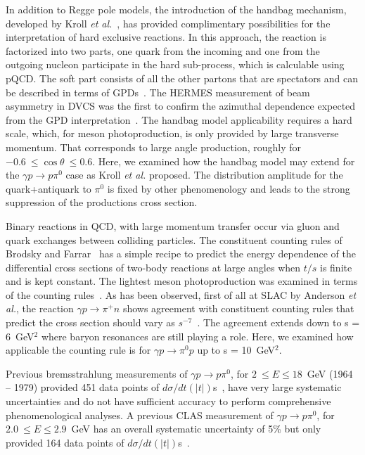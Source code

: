 \documentclass[aps,prc,twocolumn,floatfix,showpacs,preprintnumbers,amsmath,amssymb,superscriptaddress,linenumbers]{revtex4-1}
\begin{document}
 
In addition to Regge pole models, the introduction of the handbag mechanism, developed by 
Kroll \textit{et al.}~\cite{Huang:2000kd}, has provided complimentary 
possibilities for the interpretation of hard exclusive reactions. In 
this approach, the reaction is factorized into two parts, one quark 
from the incoming and one from the outgoing nucleon participate in the 
hard sub-process, which is calculable using pQCD. The soft part 
consists of all the other partons that are spectators and can be 
described in terms of GPDs~\cite{Ji:1996nm}.
The HERMES measurement of beam asymmetry in DVCS was the first 
to confirm the azimuthal dependence expected from the GPD interpretation~\cite{Amarian:2000vx}.
The handbag model applicability requires a hard scale, which, for meson 
photoproduction, is only provided by large transverse momentum. That 
corresponds to large angle production, roughly for 
$-0.6~\leq\cos\theta~\leq 0.6$.  Here, we examined how the handbag 
model may extend for the $\gamma p\rightarrow p\pi^0$ case as Kroll 
\textit{et al.} proposed. The distribution amplitude for the 
quark+antiquark to $\pi^0$ is fixed by other phenomenology and 
leads to the strong suppression of the productions cross section.	



Binary reactions in QCD, with large momentum transfer 
occur via gluon and quark exchanges between colliding particles. The 
constituent counting rules of Brodsky and Farrar~\cite{Brodsky:1973kr} 
has a simple recipe to predict the energy dependence of the 
differential cross sections of two-body reactions at large angles 
when $t/s$ is finite and is kept constant.  The lightest meson 
photoproduction was examined in terms of the counting 
rules~\cite{Anderson:1976ph,Jenkins:1995bk,Zhu:2002su,Chen:2009sda,
Kong:2015yzn}. As has been observed, first of all at SLAC by 
Anderson \textit{et al.}, the reaction $\gamma p\rightarrow\pi^+n$ 
shows agreement with constituent counting rules that predict the 
cross section should vary as $s^{-7}$~\cite{Anderson:1976ph}. The 
agreement extends down to s = 6~GeV$^2$ where baryon resonances are 
still playing a role.  Here, we examined how applicable the counting rule is 
for $\gamma p\rightarrow\pi^0p$ up to s = 10~GeV$^2$. 

Previous bremsstrahlung measurements of $\gamma p\rightarrow p\pi^0$, for $2~\leq E\leq 
18$~GeV (1964 -- 1979) provided 451 data points of $d\sigma/dt(|t|)$s~\cite{brem}, have very large systematic 
uncertainties and do not have sufficient accuracy to perform 
comprehensive phenomenological analyses.  A previous CLAS measurement of $\gamma p\rightarrow p\pi^0$, for $2.0~\leq E\leq 2.9$~GeV has an overall systematic uncertainty of 5\% but only provided 164 data points of $d\sigma/dt(|t|)$s~\cite{Dugger:2007bt}.
\end{document}
